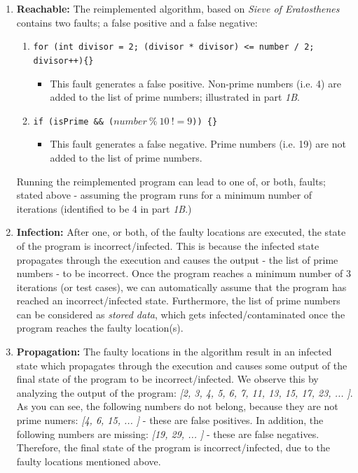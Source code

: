 \documentclass{article}
\begin{document}
\begin{enumerate}

    \item \textbf{Reachable:} The reimplemented algorithm, based on \textit{Sieve of Eratosthenes} contains two faults; a false positive and a false negative:

       \begin{enumerate}

            \item \texttt{for (int divisor = 2; (divisor * divisor) <= number / 2; divisor++)\{\}}

            \begin{itemize}
                \item This fault generates a false positive. Non-prime numbers (i.e. 4) are added to the list of prime numbers; illustrated in part \textit{1B}.
            \end{itemize}

            \item \texttt{if (isPrime \&\& ($number \ \% \ 10 \ != 9$)) \{\}}

                \begin{itemize}
                    \item This fault generates a false negative. Prime numbers (i.e. 19) are not added to the list of prime numbers.
                \end{itemize}

        \end{enumerate}

    Running the reimplemented program can lead to one of, or both, faults; stated above - assuming the program runs for a minimum number of iterations (identified to be 4 in part \textit{1B}.)

    \item \textbf{Infection:} After one, or both, of the faulty locations are executed, the state of the program is incorrect/infected. This is because the infected state propagates through the execution and causes the output - the list of prime numbers - to be incorrect. Once the program reaches a minimum number of 3 iterations (or test cases), we can automatically assume that the program has reached an incorrect/infected state. Furthermore, the list of prime numbers can be considered as \textit{stored data}, which gets infected/contaminated once the program reaches the faulty location(s).

    \item \textbf{Propagation:} The faulty locations in the algorithm result in an infected state which propagates through the execution and causes some output of the final state of the program to be incorrect/infected. We observe this by analyzing the output of the program: \textit{[2, 3, 4, 5, 6, 7, 11, 13, 15, 17, 23, ... ]}. As you can see, the following numbers do not belong, because they are not prime numers: \textit{[4, 6, 15, ... ]} - these are false positives. In addition, the following numbers are missing: \textit{[19, 29, ... ]} - these are false negatives. Therefore, the final state of the program is incorrect/infected, due to the faulty locations mentioned above.


\end{enumerate}
\end{document}
